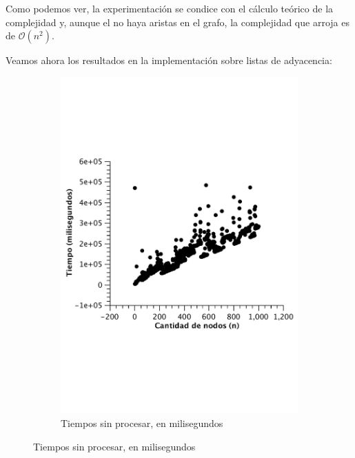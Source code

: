 Como podemos ver, la experimentación se condice con el cálculo teórico de la complejidad y, aunque el no haya aristas en el grafo, la complejidad que arroja es de $\mathcal{O}(n^2)$.


Veamos ahora los resultados en la implementación sobre listas de adyacencia:

\begin{figure}[H]
        \centering
\begin{subfigure}[b]{0.5\textwidth}
                \includegraphics[width=\textwidth]{imagenes/vacio-listas-1.pdf}
                \caption{Tiempos sin procesar, en milisegundos}
        \end{subfigure}%


\end{figure}
